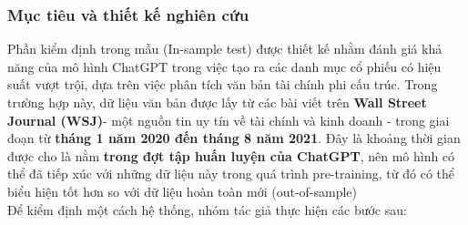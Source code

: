 \documentclass[a4paper,12pt]{article}
\begin{document}
\subsubsection{Mục tiêu và thiết kế nghiên cứu}
Phần kiểm định trong mẫu (In-sample test) được thiết kế nhằm đánh giá khả năng của mô hình ChatGPT trong việc tạo ra các danh mục cổ phiếu có hiệu suất vượt trội, dựa trên việc phân tích văn bản tài chính phi cấu trúc. Trong trường hợp này, dữ liệu văn bản được lấy từ các bài viết trên \textbf{Wall Street Journal (WSJ)}- một nguồn tin uy tín về tài chính và kinh doanh - trong giai đoạn từ \textbf{tháng 1 năm 2020 đến tháng 8 năm 2021}. Đây là khoảng thời gian được cho là nằm \textbf{trong đợt tập huấn luyện của ChatGPT}, nên mô hình có thể đã tiếp xúc với những dữ liệu này trong quá trình pre-training, từ đó có thể biểu hiện tốt hơn so với dữ liệu hoàn toàn mới (out-of-sample)
\\ Để kiểm định một cách hệ thống, nhóm tác giả thực hiện các bước sau:
\end{document}
